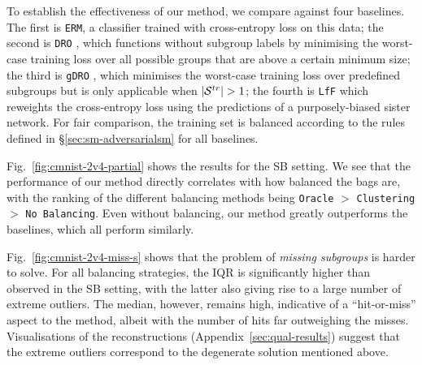 To establish the effectiveness of our method, we compare against four baselines.
%
The first is \texttt{ERM}, a classifier trained with cross-entropy loss on this data; the second is
\texttt{DRO} \citep{HasSriNamLia18}, which functions without subgroup labels by minimising the
worst-case training loss over all possible groups that are above a certain minimum size; the third
is \texttt{gDRO} \citep{sagawa2019distributionally}, which minimises the worst-case training loss
over predefined subgroups but is only applicable when $|{\mathcal{S}}^{tr}| > 1$; the fourth is \texttt{LfF}
\citep{NamChaAhnLeeetal20} which reweights the cross-entropy loss using the predictions of a
purposely-biased sister network.
%
For fair comparison, the training set is balanced according to the rules defined in
\S\ref{sec:sm-adversarialsm} for all baselines.

Fig.~\ref{fig:cmnist-2v4-partial} shows the results for the SB setting. 
%
We see that the performance of our method directly correlates with how balanced the bags are, with
the ranking of the different balancing methods being \texttt{Oracle} $>$ \texttt{Clustering}$>$
\texttt{No Balancing}. 
%
Even without balancing, our method greatly outperforms the baselines, which all perform similarly.

Fig.~\ref{fig:cmnist-2v4-miss-s} shows that the problem of \emph{missing subgroups} is harder to
solve.
%
For all balancing strategies, the IQR is significantly higher than observed in the SB setting, with
the latter also giving rise to a large number of extreme outliers. 
%
The median, however, remains high, indicative of a ``hit-or-miss'' aspect to the method, albeit
with the number of hits far outweighing the misses. 
%
Visualisations of the reconstructions (Appendix~\ref{sec:qual-results})
suggest that the extreme outliers correspond to the degenerate solution mentioned above.
%


